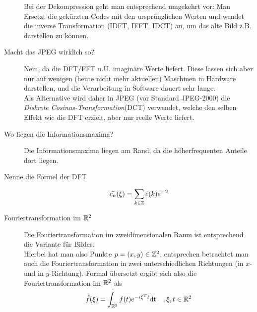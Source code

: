 \begin{description}
      Bei der Dekompression geht man entsprechend umgekehrt vor: Man Ersetzt die gekürzten Codes mit den ursprünglichen
      Werten und wendet die inverse Transformation (IDFT, IFFT, IDCT) an, um das alte Bild z.B. darstellen zu können.
    \item[Macht das JPEG wirklich so?]
      Nein, da die DFT/FFT u.U. imaginäre Werte liefert. Diese lassen sich aber nur auf wenigen (heute nicht mehr
      aktuellen) Maschinen in Hardware darstellen, und die Verarbeitung in Software dauert sehr lange.\\
      Als Alternative wird daher in JPEG (vor Standard JPEG-2000) die \emph{Diskrete Cosinus-Transformation}(DCT)
      verwendet, welche den selben Effekt wie die DFT erzielt, aber nur reelle Werte liefert.
	\item[Wo liegen die Informationsmaxima?]
      Die Informationsmaxima liegen am Rand, da die höherfrequenten Anteile dort liegen.
	\item[Nenne die Formel der DFT]
  	\[
    	\widehat{c_{n}}(\xi) = \sum_{k \in \mathbb{Z}} c(k) e^{-2}
  	\]
	\item[Fouriertransformation im $\mathbb{R}^2$]
      Die Fouriertransformation im zweidimensionalen Raum ist entsprechend die Variante für Bilder.\\
      Hierbei hat man also Punkte $p = (x, y) \in \mathbb{Z}^2$, entsprechen betrachtet man auch die Fouriertransformation
      in zwei unterschiedlichen Richtungen (in $x$- und in $y$-Richtung). Formal übersetzt ergibt sich also die
      Fouriertransformation im $\mathbb{R}^2$ als
      $$ \hat f(\xi) = \int_{\mathbb{R}^2} f(t)e^{-i \xi^T t}\text{dt}\quad, \xi,t\in\mathbb{R}^2 $$
\end{description}
